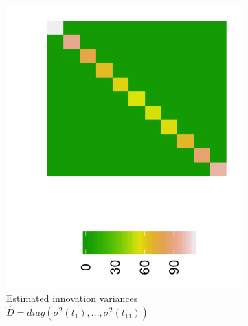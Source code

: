 \begin{figure}[H]
\begin{subfigure}{.33\textwidth}
  \includegraphics[width = \textwidth]{img/chapter-5/cattle-D-estimate-ggplot}
 \caption{Estimated innovation variances \newline $\hat{D} = diag\left( \sigma^2\left(t_1\right),\dots, \sigma^2\left(t_{11}\right) \right)$}
 \end{subfigure}
 \begin{subfigure}{.33\textwidth}
  \centering

\end{subfigure}
\end{figure}
